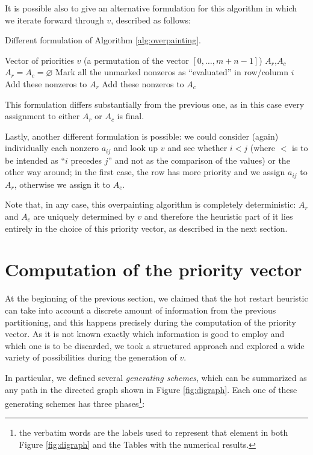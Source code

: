 It is possible also to give an alternative formulation for this algorithm in which we iterate forward through $v$, described as follows:

\begin{algorithm}[H]
\caption{Different formulation of Algorithm \ref{alg:overpainting}.} \label{alg:overpainting-2}
\begin{algorithmic}
\STATE
\REQUIRE Vector of priorities $v$ (a permutation of the vector $[0,\dots,m+n-1]$)
\ENSURE $A_r$,$A_c$
\STATE 
\STATE $A_r = A_c = \varnothing$
\STATE Mark all the unmarked nonzeros as ``evaluated'' in row/column $i$
\STATE Add these nonzeros to $A_r$
\ELSE
\STATE Add these nonzeros to $A_c$
\ENDIF
\ENDFOR
\end{algorithmic}
\end{algorithm}

This formulation differs substantially from the previous one, as in this case every assignment to either $A_r$ or $A_c$ is final.

Lastly, another different formulation is possible:  we could consider (again) individually each nonzero $a_{ij}$ and look up $v$ and see whether $i < j$ (where $<$ is to be intended as ``$i$ precedes $j$'' and not as the comparison of the values) or the other way around; in the first case, the row has more priority and we assign $a_{ij}$ to $A_r$, otherwise we assign it to $A_c$.

Note that, in any case, this overpainting algorithm is completely deterministic: $A_r$ and $A_c$ are uniquely determined by $v$ and therefore the heuristic part of it lies entirely in the choice of this priority vector, as described in the next section.

\section{Computation of the priority vector}

At the beginning of the previous section, we claimed that the hot restart heuristic can take into account a discrete amount of information from the previous partitioning, and this happens precisely during the computation of the priority vector. As it is not known exactly which information is good to employ and which one is to be discarded, we took a structured approach and explored a wide variety of possibilities during the generation of $v$.

In particular, we defined several \emph{generating schemes}, which can be summarized as any path in the directed graph shown in Figure \ref{fig:digraph}. Each one of these generating schemes has three phases\footnote{the verbatim words are the labels used to represent that element in both Figure \ref{fig:digraph} and the Tables with the numerical results.}:

